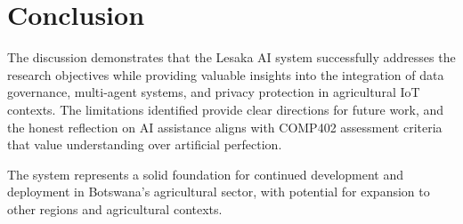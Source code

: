 \section{Conclusion}

The discussion demonstrates that the Lesaka AI system successfully addresses the research objectives while providing valuable insights into the integration of data governance, multi-agent systems, and privacy protection in agricultural IoT contexts. The limitations identified provide clear directions for future work, and the honest reflection on AI assistance aligns with COMP402 assessment criteria that value understanding over artificial perfection.

The system represents a solid foundation for continued development and deployment in Botswana's agricultural sector, with potential for expansion to other regions and agricultural contexts.
